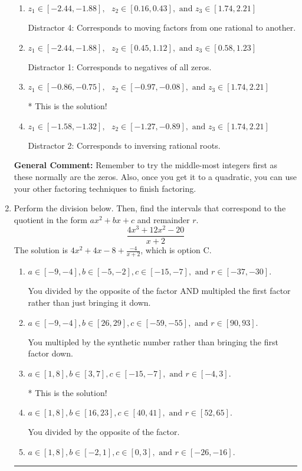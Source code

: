 \documentclass{extbook}[14pt]
\newcommand{\litem}[1]{\item #1

\rule{\textwidth}{0.4pt}}
\begin{document}
\begin{enumerate}
{\begin{enumerate}[label=\Alph*.]
 Distractor 3: Corresponds to negatives of all zeros AND inversing rational roots.
\item \( z_1 \in [-2.44, -1.88], \text{   }  z_2 \in [0.16, 0.43], \text{   and   } z_3 \in [1.74, 2.21] \)

 Distractor 4: Corresponds to moving factors from one rational to another.
\item \( z_1 \in [-2.44, -1.88], \text{   }  z_2 \in [0.45, 1.12], \text{   and   } z_3 \in [0.58, 1.23] \)

 Distractor 1: Corresponds to negatives of all zeros.
\item \( z_1 \in [-0.86, -0.75], \text{   }  z_2 \in [-0.97, -0.08], \text{   and   } z_3 \in [1.74, 2.21] \)

* This is the solution!
\item \( z_1 \in [-1.58, -1.32], \text{   }  z_2 \in [-1.27, -0.89], \text{   and   } z_3 \in [1.74, 2.21] \)

 Distractor 2: Corresponds to inversing rational roots.
\end{enumerate}

\textbf{General Comment:} Remember to try the middle-most integers first as these normally are the zeros. Also, once you get it to a quadratic, you can use your other factoring techniques to finish factoring.
}
\litem{
Perform the division below. Then, find the intervals that correspond to the quotient in the form $ax^2+bx+c$ and remainder $r$.
\[ \frac{4x^{3} +12 x^{2} -20}{x + 2} \]The solution is \( 4x^{2} +4 x -8 + \frac{-4}{x + 2} \), which is option C.\begin{enumerate}[label=\Alph*.]
\item \( a \in [-9, -4], b \in [-5, -2], c \in [-15, -7], \text{ and } r \in [-37, -30]. \)

 You divided by the opposite of the factor AND multipled the first factor rather than just bringing it down.
\item \( a \in [-9, -4], b \in [26, 29], c \in [-59, -55], \text{ and } r \in [90, 93]. \)

 You multipled by the synthetic number rather than bringing the first factor down.
\item \( a \in [1, 8], b \in [3, 7], c \in [-15, -7], \text{ and } r \in [-4, 3]. \)

* This is the solution!
\item \( a \in [1, 8], b \in [16, 23], c \in [40, 41], \text{ and } r \in [52, 65]. \)

 You divided by the opposite of the factor.
\item \( a \in [1, 8], b \in [-2, 1], c \in [0, 3], \text{ and } r \in [-26, -16]. \)


\end{enumerate}}
\end{enumerate}
\end{document}
